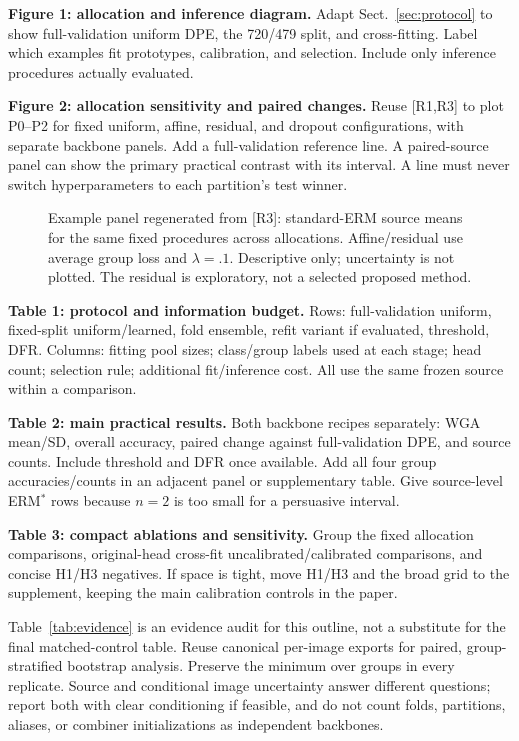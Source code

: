 \documentclass[runningheads]{llncs}
\begin{document}
\textbf{Figure 1: allocation and inference diagram.} Adapt Sect.~\ref{sec:protocol} to show full-validation uniform DPE, the 720/479 split, and cross-fitting. Label which examples fit prototypes, calibration, and selection. Include only inference procedures actually evaluated.

\textbf{Figure 2: allocation sensitivity and paired changes.} Reuse [R1,R3] to plot P0--P2 for fixed uniform, affine, residual, and dropout configurations, with separate backbone panels. Add a full-validation reference line. A paired-source panel can show the primary practical contrast with its interval. A line must never switch hyperparameters to each partition's test winner.

\begin{figure}[ht]
\centering
\caption{Example panel regenerated from [R3]: standard-ERM source means for the same fixed procedures across allocations. Affine/residual use average group loss and $\lambda=.1$. Descriptive only; uncertainty is not plotted. The residual is exploratory, not a selected proposed method.}
\label{fig:allocation}
\end{figure}

\textbf{Table 1: protocol and information budget.} Rows: full-validation uniform, fixed-split uniform/learned, fold ensemble, refit variant if evaluated, threshold, DFR. Columns: fitting pool sizes; class/group labels used at each stage; head count; selection rule; additional fit/inference cost. All use the same frozen source within a comparison.

\textbf{Table 2: main practical results.} Both backbone recipes separately: WGA mean/SD, overall accuracy, paired change against full-validation DPE, and source counts. Include threshold and DFR once available. Add all four group accuracies/counts in an adjacent panel or supplementary table. Give source-level ERM$^*$ rows because $n=2$ is too small for a persuasive interval.

\textbf{Table 3: compact ablations and sensitivity.} Group the fixed allocation comparisons, original-head cross-fit uncalibrated/calibrated comparisons, and concise H1/H3 negatives. If space is tight, move H1/H3 and the broad grid to the supplement, keeping the main calibration controls in the paper.

Table~\ref{tab:evidence} is an evidence audit for this outline, not a substitute for the final matched-control table. Reuse canonical per-image exports for paired, group-stratified bootstrap analysis. Preserve the minimum over groups in every replicate. Source and conditional image uncertainty answer different questions; report both with clear conditioning if feasible, and do not count folds, partitions, aliases, or combiner initializations as independent backbones.
\end{document}
